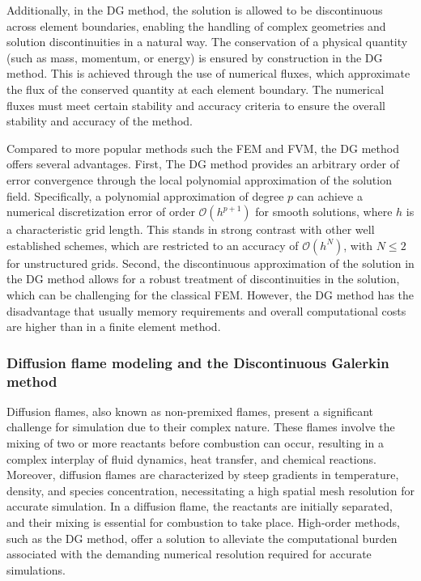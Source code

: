 Additionally, in the DG method, the solution is allowed to be discontinuous across element boundaries, enabling the handling of complex geometries and solution discontinuities in a natural way. The conservation of a physical quantity (such as mass, momentum, or energy)  is ensured by construction in the DG method. This is achieved through the use of numerical fluxes, which approximate the flux of the conserved quantity at each element boundary. The numerical fluxes must meet certain stability and accuracy criteria to ensure the overall stability and accuracy of the method. 


Compared to more popular methods such the \gls{FEM} and \gls{FVM}, the DG method offers several advantages. First, The DG method provides an arbitrary order of error convergence through the local polynomial approximation of the solution field. Specifically, a polynomial approximation of degree $p$ can achieve a numerical discretization error of order $\mathcal{O}(h^{p+1})$ for smooth solutions, where $h$ is a characteristic grid length. This stands in strong contrast with other well established schemes, which are restricted to an accuracy of $\mathcal{O}(h^N)$, with $N \leq 2$ for unstructured grids. Second, the discontinuous approximation of the solution in the DG method allows for a robust treatment of discontinuities in the solution, which can be challenging for the classical \gls{FEM}. However, the DG method has the disadvantage that usually memory requirements  and overall computational costs are higher than in a finite element method.

\subsubsection{Diffusion flame modeling and the Discontinuous Galerkin method}
Diffusion flames, also known as non-premixed flames, present a significant challenge for simulation due to their complex nature. These flames involve the mixing of two or more reactants before combustion can occur, resulting in a complex interplay of fluid dynamics, heat transfer, and chemical reactions. Moreover, diffusion flames are characterized by steep gradients in temperature, density, and species concentration, necessitating a high spatial mesh resolution for accurate simulation. In a diffusion flame, the reactants are initially separated, and their mixing is essential for combustion to take place. High-order methods, such as the DG method, offer a solution to alleviate the computational burden associated with the demanding numerical resolution required for accurate simulations.
 
